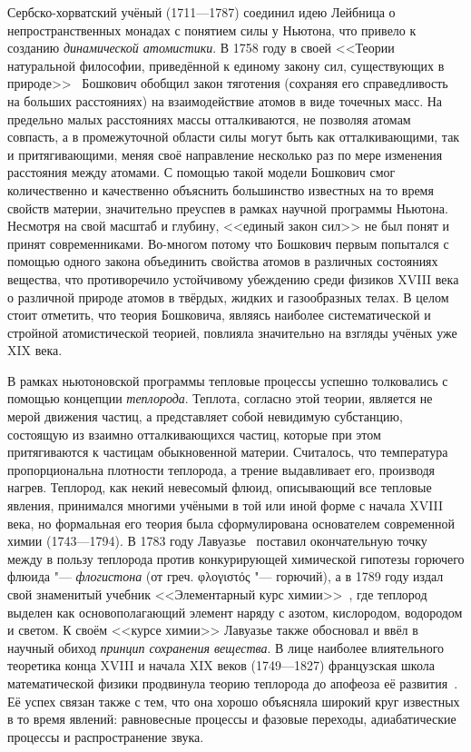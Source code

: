 \documentclass[a4paper, 12pt, oneside]{article} %
\begin{document}
Сербско-хорватский учёный  (1711---1787)
соединил идею Лейбница о непространственных монадах с понятием силы у
Ньютона, что привело к созданию \emph{динамической атомистики}. В 1758
году в своей <<Теории натуральной философии, приведённой к единому
закону сил, существующих в природе>>~\cite{boscovich1966philosophiae}
Бошкович обобщил закон тяготения (сохраняя его справедливость на больших
расстояниях) на взаимодействие атомов в виде точечных масс. На предельно
малых расстояниях массы отталкиваются, не позволяя атомам совпасть, а в
промежуточной области силы могут быть как отталкивающими, так и
притягивающими, меняя своё направление несколько раз по мере изменения
расстояния между атомами. С помощью такой модели Бошкович смог
количественно и качественно объяснить большинство известных на то время
свойств материи, значительно преуспев в рамках научной программы
Ньютона. Несмотря на свой масштаб и глубину, <<единый закон сил>> не
был понят и принят современниками. Во-многом потому что Бошкович первым
попытался с помощью одного закона объединить свойства атомов в различных
состояниях вещества, что противоречило устойчивому убеждению среди
физиков XVIII века о различной природе атомов в твёрдых, жидких и
газообразных телах. В целом стоит отметить, что теория Бошковича,
являясь наиболее систематической и стройной атомистической теорией,
повлияла значительно на взгляды учёных уже XIX века.

В рамках ньютоновской программы тепловые процессы успешно толковались с
помощью концепции \emph{теплорода}. Теплота, согласно этой теории,
является не мерой движения частиц, а представляет собой невидимую
субстанцию, состоящую из взаимно отталкивающихся частиц, которые при
этом притягиваются к частицам обыкновенной материи. Считалось, что
температура пропорциональна плотности теплорода, а трение выдавливает
его, производя нагрев. Теплород, как некий невесомый флюид, описывающий
все тепловые явления, принимался многими учёными в той или иной форме с
начала XVIII века, но формальная его теория была сформулирована
основателем современной химии  (1743---1794).
В 1783 году Лавуазье~\cite{lavoisier1783reflexions} поставил
окончательную точку между в пользу теплорода против конкурирующей
химической гипотезы горючего флюида "--- \emph{флогистона} (от греч.
\foreignlanguage{greek}{φλογιστός} "--- горючий), а в 1789 году издал
свой знаменитый учебник <<Элементарный курс
химии>>~\cite{lavoisier1793traite}, где теплород выделен как
основополагающий элемент наряду с азотом, кислородом, водородом и
светом. К своём <<курсе химии>> Лавуазье также обосновал и ввёл в
научный обиход \emph{принцип сохранения вещества}. В лице наиболее
влиятельного теоретика конца XVIII и начала XIX веков
 (1749---1827) французская школа
математической физики продвинула теорию теплорода до апофеоза её
развития~\cite{laplace1824attraction}. Её успех связан также с тем, что
она хорошо объясняла широкий круг известных в то время явлений:
равновесные процессы и фазовые переходы, адиабатические процессы и
распространение звука.
\end{document}
